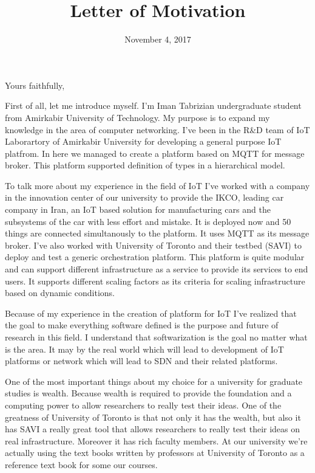 \documentclass[11pt,a4paper,sans]{moderncv}        %
\title{Letter of Motivation}                               %
\begin{document}
\date{November 4, 2017}
\opening{}
\closing{Yours faithfully,}

\makelettertitle

First of all, let me introduce myself. I'm Iman Tabrizian undergraduate student
from Amirkabir University of Technology. My purpose is to expand my knowledge
in the area of computer networking. I've been in the R\&D team of IoT Laborartory
of Amirkabir University for developing a general purpose IoT platfrom.
In here we managed to create a platform based on MQTT for message broker.
This platform supported definition of types in a hierarchical model.

To talk more about my experience in the field of IoT I've worked with a
company in the innovation center of our university to provide the IKCO,
leading car company in Iran, an IoT based solution for manufacturing cars
and the subsystems of the car with less effort and mistake. It is deployed now
and 50 things are connected simultanously to the platform. It uses MQTT as its message broker.
I've also worked with University of Toronto and their testbed (SAVI) to deploy
and test a generic orchestration platform. This platform is quite modular
and can support different infrastructure as a service to provide its services
to end users. It supports different scaling factors as its criteria for scaling
infrastructure based on dynamic conditions.

Because of my experience in the creation of platform for IoT I've realized that
the goal to make everything software defined is the purpose and future of
research in this field. I understand that softwarization is the
goal no matter what is the area. It may by the real world which will lead
to development of IoT platforms or network which will lead to SDN and their
related platforms.

One of the most important things about my choice for a university for graduate
studies is wealth. Because wealth is required to provide the foundation and
a computing power to allow researchers to really test their ideas. One of the
greatness of University of Toronto is that not only it has the wealth, but also
it has SAVI a really great tool that allows researchers to really test their
ideas on real infrastructure. Moreover it has rich faculty members. At our
university we're actually using the text books written by professors at University
of Toronto as a reference text book for some our courses.
\end{document}
